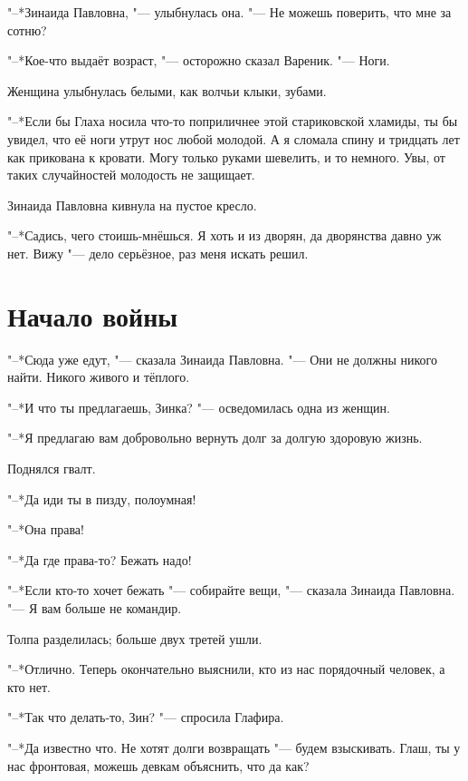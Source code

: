 "--*Зинаида Павловна, "--- улыбнулась она.
"--- Не можешь поверить, что мне за сотню?

"--*Кое-что выдаёт возраст, "--- осторожно сказал Вареник.
"--- Ноги.

Женщина улыбнулась белыми, как волчьи клыки, зубами.

"--*Если бы Глаха носила что-то поприличнее этой стариковской хламиды, ты бы увидел, что её ноги утрут нос любой молодой. 
А я сломала спину и тридцать лет как прикована к кровати.
Могу только руками шевелить, и то немного.
Увы, от таких случайностей молодость не защищает.

Зинаида Павловна кивнула на пустое кресло.

"--*Садись, чего стоишь-мнёшься.
Я хоть и из дворян, да дворянства давно уж нет.
Вижу "--- дело серьёзное, раз меня искать решил.

\section{\spacing}

\section{Начало войны}

"--*Сюда уже едут, "--- сказала Зинаида Павловна.
"--- Они не должны никого найти.
Никого живого и тёплого.

"--*И что ты предлагаешь, Зинка? "--- осведомилась одна из женщин.

"--*Я предлагаю вам добровольно вернуть долг за долгую здоровую жизнь.

Поднялся гвалт.

"--*Да иди ты в пизду, полоумная!

"--*Она права!

"--*Да где права-то?
Бежать надо!

"--*Если кто-то хочет бежать "--- собирайте вещи, "--- сказала Зинаида Павловна.
"--- Я вам больше не командир.

Толпа разделилась;
больше двух третей ушли.

"--*Отлично.
Теперь окончательно выяснили, кто из нас порядочный человек, а кто нет.

"--*Так что делать-то, Зин? "--- спросила Глафира.

"--*Да известно что.
Не хотят долги возвращать "--- будем взыскивать.
Глаш, ты у нас фронтовая, можешь девкам объяснить, что да как?

